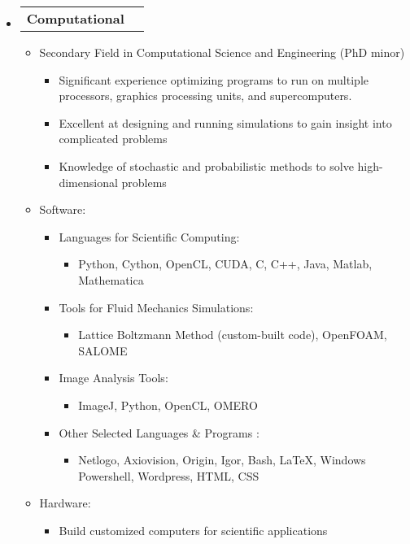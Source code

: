 \documentclass[letterpaper,11pt]{article}
\makeatletter
\newcommand{\resitem}[1]{\item #1 \vspace{-2pt}}
\newcommand{\award}[2]{\vspace{-5pt}
\begin{tabular*}{7.0in}{l@{\extracolsep{\fill}}r}
                \textbf{#1} & #2 
\end{tabular*}\vspace{-8pt}}
\makeatother
\begin{document}
\begin{itemize}

\item \award{Computational}{}

\begin{itemize}

\resitem{Secondary Field in Computational Science and Engineering (PhD minor)}
        \begin{itemize}
        \resitem{Significant experience optimizing programs to run on multiple processors, graphics processing units, and supercomputers.}
        \resitem{Excellent at designing and running simulations to gain insight into complicated problems}
        \resitem{Knowledge of stochastic and probabilistic methods to solve high-dimensional problems}
        \end{itemize}

\resitem{Software:}

\begin{itemize}

        \resitem{Languages for Scientific Computing:} 
                \begin{itemize}
                \resitem{Python, Cython, OpenCL, CUDA, C, C++, Java, Matlab, Mathematica}
                \end{itemize}
        
        \resitem{Tools for Fluid Mechanics Simulations:}
                \begin{itemize}
                \resitem{Lattice Boltzmann Method (custom-built code), OpenFOAM, SALOME}
                \end{itemize}        
        \resitem{Image Analysis Tools:}
                \begin{itemize}
                \resitem{ImageJ, Python, OpenCL, OMERO}
                \end{itemize}
        
        \resitem{Other Selected Languages \& Programs}:
                \begin{itemize}
                \resitem{Netlogo, Axiovision, Origin, Igor, Bash, \LaTeX, Windows Powershell, Wordpress, HTML, CSS}
                \end{itemize}
        
\end{itemize}

\resitem{Hardware:} 
        \begin{itemize}
        \resitem{Build customized computers for scientific applications}
        \end{itemize}


\end{itemize}
\end{itemize}
\end{document}
